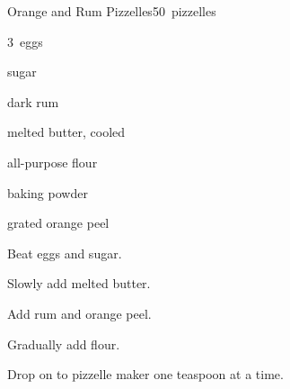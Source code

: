 \begin{recipe}{Orange and Rum Pizzelles}{}{50~pizzelles}

\begin{ingredients}
\item 3~eggs
\item {} sugar
\item {} dark rum
\item \C{\half} melted butter, cooled
\item {} all-purpose flour
\item {} baking powder
\item {} grated orange peel
\end{ingredients}

\begin{directions}
\item Beat eggs and sugar.
\item Slowly add melted butter.
\item Add rum and orange peel.
\item Gradually add flour.
\item Drop on to pizzelle maker one teaspoon at a time.
\end{directions}

\end{recipe}
